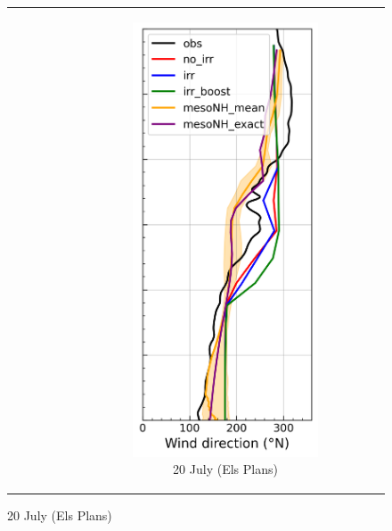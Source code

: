 \begin{figure}[hbtp]
{\begin{tabular}{@{}cccc@{}}
\begin{subfigure}[t]{0.283\textwidth}
        \end{subfigure} &
        \begin{subfigure}[t]{0.283\textwidth}
            \caption{20 July (Els Plans)}
            \includegraphics[width=\textwidth]{images/chap5/profiles/profile_elsplans_wind_direction_2007_.png}

\end{subfigure}
\end{tabular}}
\end{figure}
